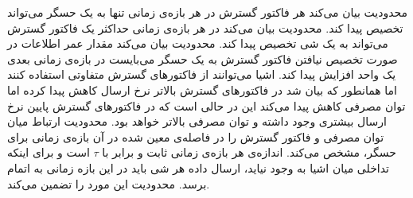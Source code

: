 محدودیت  بیان می‌کند هر فاکتور گسترش در هر بازه‌ی زمانی تنها به یک حسگر می‌تواند تخصیص پیدا کند.
محدودیت  بیان می‌کند در هر بازه‌ی زمانی حداکثر یک فاکتور گسترش می‌تواند به یک شی تخصیص پیدا کند.
محدودیت  بیان می‌کند مقدار عمر اطلاعات در صورت تخصیص نیافتن فاکتور گسترش به یک حسگر می‌بایست در بازه‌ی زمانی بعدی یک واحد افزایش پیدا کند.
اشیا می‌توانند از فاکتورهای گسترش متفاوتی استفاده کنند اما همانطور که بیان شد در فاکتورهای گسترش بالاتر نرخ ارسال کاهش پیدا کرده اما توان مصرفی کاهش پیدا می‌کند این در حالی است که
در فاکتورهای گسترش پایین نرخ ارسال بیشتری وجود داشته و توان مصرفی بالاتر خواهد بود. محدودیت  ارتباط میان توان مصرفی و فاکتور گسترش را در فاصله‌ی
معین شده در آن بازه‌ی زمانی برای حسگر، مشخص می‌کند.
اندازه‌ی هر بازه‌ی زمانی ثابت و برابر با $\tau$ است و برای اینکه تداخلی میان اشیا به وجود نیاید، ارسال داده هر شی باید در این بازه زمانی به اتمام برسد.
محدودیت  این مورد را تضمین می‌کند.
